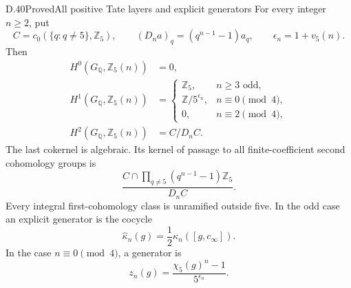 \begin{statement}{D.40}{Proved}{All positive Tate layers and explicit generators}
For every integer \(n\ge2\), put
\[
 C=c_0(\{q:q\ne5\},\mathbb Z_5),\qquad
 (D_na)_q=(q^{n-1}-1)a_q,\qquad
 \epsilon_n=1+v_5(n).
\]
Then
\[
\begin{split}
 H^0(G_{\mathbb Q},\mathbb Z_5(n))&=0,\\
 H^1(G_{\mathbb Q},\mathbb Z_5(n))&=
 \begin{cases}
  \mathbb Z_5,&n\ge3\text{ odd},\\
  \mathbb Z/5^{\epsilon_n},&n\equiv0\pmod4,\\
  0,&n\equiv2\pmod4,
 \end{cases}\\
 H^2(G_{\mathbb Q},\mathbb Z_5(n))&=C/D_nC.
\end{split}
\tag{D.40.1}
\]
The last cokernel is algebraic. Its kernel of passage
to all finite-coefficient second cohomology groups is
\[
 \frac{C\cap\prod_{q\ne5}(q^{n-1}-1)\mathbb Z_5}{D_nC}.
                                                               \tag{D.40.2}
\]
Every integral first-cohomology class is unramified outside
five. In the odd case an explicit generator is the cocycle
\[
          \widehat\kappa_n(g)
                   =\frac12\kappa_n([g,c_\infty]).        \tag{D.40.3}
\]
In the case \(n\equiv0\pmod4\), a generator is
\[
           z_n(g)=\frac{\chi_5(g)^n-1}{5^{\epsilon_n}}.
                                                               \tag{D.40.4}
\]
\end{statement}

